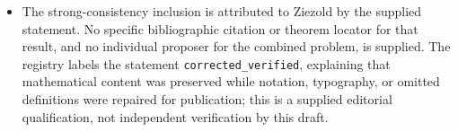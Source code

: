 \documentclass[11pt]{article}
\begin{document}
\begin{itemize}
\item The strong-consistency inclusion is attributed to Ziezold by the supplied statement. No specific bibliographic citation or theorem locator for that result, and no individual proposer for the combined problem, is supplied. The registry labels the statement \texttt{corrected\_verified}, explaining that mathematical content was preserved while notation, typography, or omitted definitions were repaired for publication; this is a supplied editorial qualification, not independent verification by this draft.
\end{itemize}
\end{document}
